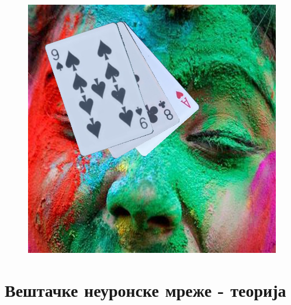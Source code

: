 \begin{frame}
\begin{figure}[H]
      \includegraphics[scale=0.18]{slike/triKarte.jpg}
 \end{figure}
\end{frame}

\section{Вештачке неуронске мреже - теорија}
